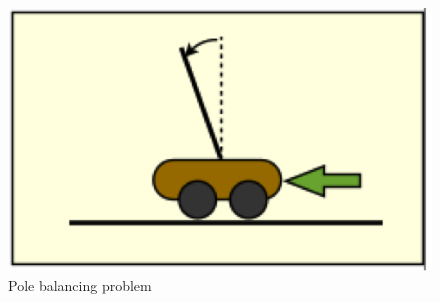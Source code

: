 \documentclass[11pt]{article} %
\begin{document}
\begin{figure}[hbtp]
\center
\includegraphics[scale=0.5]{fig06}
\caption{Pole balancing problem}
\label{fig:pole_diag}
\end{figure}
\end{document}
